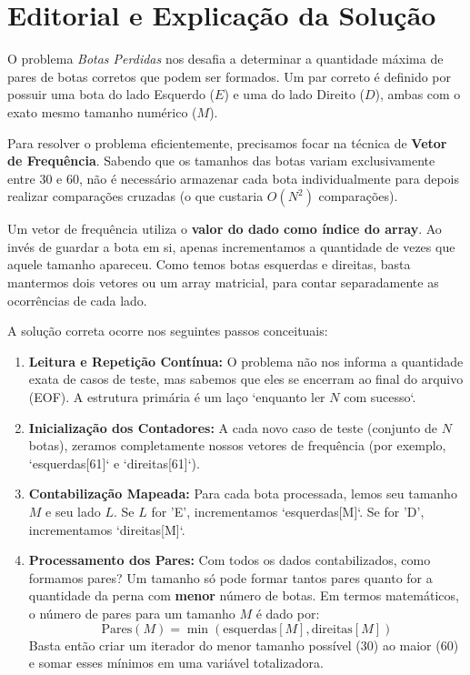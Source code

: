\documentclass[11pt]{article}
\begin{document}
\section{Editorial e Explicação da Solução}

O problema \textit{Botas Perdidas} nos desafia a determinar a quantidade máxima de pares de botas corretos que podem ser formados. Um par correto é definido por possuir uma bota do lado Esquerdo ($E$) e uma do lado Direito ($D$), ambas com o exato mesmo tamanho numérico ($M$).

Para resolver o problema eficientemente, precisamos focar na técnica de \textbf{Vetor de Frequência}. Sabendo que os tamanhos das botas variam exclusivamente entre 30 e 60, não é necessário armazenar cada bota individualmente para depois realizar comparações cruzadas (o que custaria $O(N^2)$ comparações). 

\begin{notebox}
Um vetor de frequência utiliza o \textbf{valor do dado como índice do array}. Ao invés de guardar a bota em si, apenas incrementamos a quantidade de vezes que aquele tamanho apareceu. Como temos botas esquerdas e direitas, basta mantermos dois vetores ou um array matricial, para contar separadamente as ocorrências de cada lado.
\end{notebox}

A solução correta ocorre nos seguintes passos conceituais:
\begin{enumerate}
    \item \textbf{Leitura e Repetição Contínua:} O problema não nos informa a quantidade exata de casos de teste, mas sabemos que eles se encerram ao final do arquivo (EOF). A estrutura primária é um laço `enquanto ler $N$ com sucesso`.
    \item \textbf{Inicialização dos Contadores:} A cada novo caso de teste (conjunto de $N$ botas), zeramos completamente nossos vetores de frequência (por exemplo, `esquerdas[61]` e `direitas[61]`).
    \item \textbf{Contabilização Mapeada:} Para cada bota processada, lemos seu tamanho $M$ e seu lado $L$. Se $L$ for 'E', incrementamos `esquerdas[M]`. Se for 'D', incrementamos `direitas[M]`.
    \item \textbf{Processamento dos Pares:} Com todos os dados contabilizados, como formamos pares? Um tamanho só pode formar tantos pares quanto for a quantidade da perna com \textbf{menor} número de botas. Em termos matemáticos, o número de pares para um tamanho $M$ é dado por: 
    \[
        \text{Pares}(M) = \min(\text{esquerdas}[M], \text{direitas}[M])
    \]
    Basta então criar um iterador do menor tamanho possível (30) ao maior (60) e somar esses mínimos em uma variável totalizadora.
\end{enumerate}
\end{document}

